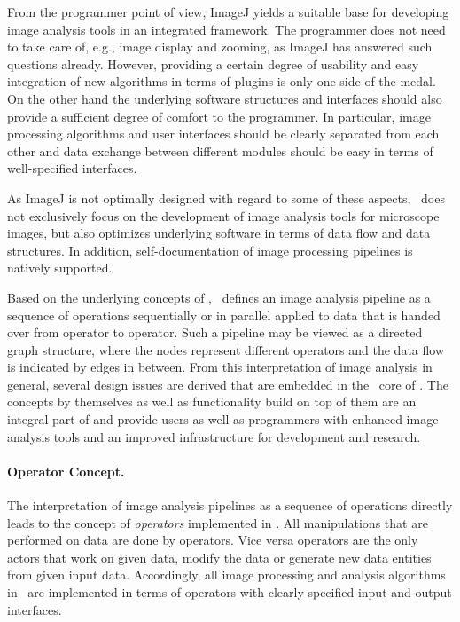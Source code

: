 From the programmer point of view, ImageJ yields a suitable base for developing
image analysis tools in an integrated
framework. The programmer does not need to take care of, e.g., image display and zooming, as ImageJ
has answered such questions already. However, providing a certain degree of usability and easy integration
of new algorithms in terms of plugins is only one side of the medal. On the
other hand the underlying software
structures and interfaces should also provide a sufficient degree of comfort to the
programmer. In particular, image processing algorithms and user interfaces should be clearly separated from each other and data exchange between
different modules should be easy in terms of well-specified interfaces. 

As ImageJ is not optimally designed with regard to some of these aspects,
\mitobo\ does not exclusively focus on the
development of image analysis tools for microscope images, but also optimizes underlying software
in terms of data flow and data structures. In addition, self-documentation of image processing
pipelines is natively supported.

Based on the underlying concepts of \alida, \mitobo\ defines an image analysis pipeline as a sequence of operations sequentially or in
parallel applied to data that is handed over from operator to operator. Such a pipeline may be
viewed as a directed graph structure, where the nodes represent different operators and the data
flow is indicated by edges in between. From this interpretation of image analysis in
general, several design issues are derived that are embedded in the \alida\ core of
\mitobo. The concepts by themselves as well as functionality build on top of them are an integral part of \mitobo 
and provide users as well as programmers with enhanced image analysis tools and an improved
infrastructure for development and research.

\paragraph{Operator Concept.} The interpretation of image analysis pipelines as a
sequence of operations directly leads to the concept of {\em operators} implemented in \mitobo. 
All manipulations that are performed on data are done by operators. Vice versa operators
are the only actors that work on given data, modify the data or generate new
data entities from given input data. Accordingly, all image processing and
analysis algorithms in \mitobo\ are implemented in terms of operators with clearly specified input and output interfaces.

